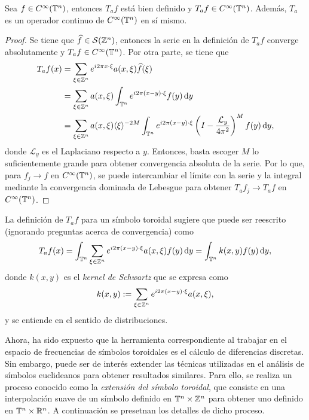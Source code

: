 \begin{proposition}
	Sea $f\in C^\infty(\mathbb{T}^n)$, entonces $T_af$ está bien definido y $T_af\in C^\infty(\mathbb{T}^n)$. Además, $T_a$ es un operador continuo de $C^\infty(\mathbb{T}^n)$ en sí mismo.
\end{proposition}
\begin{proof}
	Se tiene que $\widehat{f}\in\mathcal{S}(\mathbb{Z}^n)$, entonces la serie en la definición de $T_af$ converge absolutamente y $T_af\in C^\infty(\mathbb{T}^n)$. Por otra parte, se tiene que
	\begin{align*}
		T_af(x) &= \sum_{\xi\in\mathbb{Z}^n}e^{i2\pi x\cdot\xi} a(x, \xi) \widehat{f}(\xi) \\
		& = \sum_{\xi\in\mathbb{Z}^n}a(x, \xi) \int_{\mathbb{T}^n} e^{i2\pi (x-y)\cdot\xi} f(y) \mathop{}\!\mathrm{d} y\\
		& = \sum_{\xi\in\mathbb{Z}^n}a(x, \xi)\langle\xi\rangle^{-2M} \int_{\mathbb{T}^n} e^{i2\pi (x-y)\cdot\xi} \left(I-\frac{\mathcal{L}_y}{4\pi^2}\right)^M f(y) \mathop{}\!\mathrm{d} y,
	\end{align*}
	donde $\mathcal{L}_y$ es el Laplaciano respecto a $y$. Entonces, basta escoger $M$ lo suficientemente grande para obtener convergencia absoluta de la serie. Por lo que, para $f_j\to f$ en $C^\infty(\mathbb{T}^n)$, se puede intercambiar el límite con la serie y la integral mediante la convergencia dominada de Lebesgue para obtener $T_af_j\to T_af$ en $C^\infty(\mathbb{T}^n)$.
\end{proof}
\begin{remark}
	La definición de $T_af$ para un símbolo toroidal sugiere que puede ser reescrito (ignorando preguntas acerca de convergencia) como 
	\begin{equation*}
		T_af(x) = \int_{\mathbb{T}^n} \sum_{\xi\in\mathbb{Z}^n} e^{i2\pi (x-y)\cdot\xi} a(x, \xi) f(y) \mathop{}\!\mathrm{d} y =\int_{\mathbb{T}^n} k(x, y)f(y)\mathop{}\!\mathrm{d} y,
	\end{equation*}
	donde $k(x, y)$ es el \textit{kernel de Schwartz} que se expresa como 
	\begin{equation*}
		k(x, y) := \sum_{\xi\in\mathbb{Z}^n} e^{i2\pi (x-y)\cdot\xi} a(x, \xi),
	\end{equation*}
	y se entiende en el sentido de distribuciones. 
\end{remark}
Ahora, ha sido expuesto que la herramienta correspondiente al trabajar en el espacio de frecuencias de símbolos toroidales es el cálculo de diferencias discretas. Sin embargo, puede ser de interés extender las técnicas utilizadas en el análisis de símbolos euclideanos para obtener resultados similares. Para ello, se realiza un proceso conocido como la \textit{extensión del símbolo toroidal}, que consiste en una interpolación suave de un símbolo definido en $\mathbb{T}^n\times\mathbb{Z}^n$ para obtener uno definido en $\mathbb{T}^n\times\mathbb{R}^n$. A continuación se presetnan los detalles de dicho proceso. 
